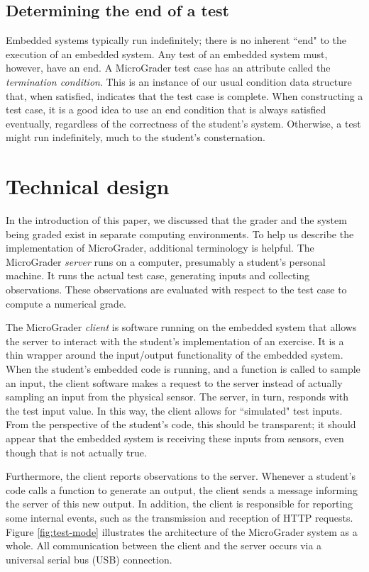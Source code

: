 \documentclass[12pt]{article}
\begin{document}
\subsection{Determining the end of a test}
Embedded systems typically run indefinitely; there is no inherent ``end" to the execution of an embedded system.  Any test of an embedded system must, however, have an end.  A MicroGrader test case has an attribute called the \textit{termination condition}.  This is an instance of our usual condition data structure that, when satisfied, indicates that the test case is complete.  When constructing a test case, it is a good idea to use an end condition that is always satisfied eventually, regardless of the correctness of the student's system.  Otherwise, a test might run indefinitely, much to the student's consternation.



\clearpage
\section{Technical design }
In the introduction of this paper, we discussed that the grader and the system being graded exist in separate computing environments.  To help us describe the implementation of MicroGrader, additional terminology is helpful.  The MicroGrader \textit{server} runs on a computer, presumably a student's personal machine.  It runs the actual test case, generating inputs and collecting observations.  These observations are evaluated with respect to the test case to compute a numerical grade.

The MicroGrader \textit{client} is software running on the embedded system that allows the server to interact with the student's implementation of an exercise.  It is a thin wrapper around the input/output functionality of the embedded system.  When the student's embedded code is running, and a function is called to sample an input, the client software makes a request to the server instead of actually sampling an input from the physical sensor.  The server, in turn, responds with the test input value.  In this way, the client allows for 	``simulated" test inputs.  From the perspective of the student's code, this should be transparent; it should appear that the embedded system is receiving these inputs from sensors, even though that is not actually true.

Furthermore, the client reports observations to the server.  Whenever a student's code calls a function to generate an output, the client sends a message informing the server of this new output.  In addition, the client is responsible for reporting some internal events, such as the transmission and reception of HTTP requests.  Figure \ref{fig:test-mode} illustrates the architecture of the MicroGrader system as a whole.  All communication between the client and the server occurs via a universal serial bus (USB) connection.
\end{document}
